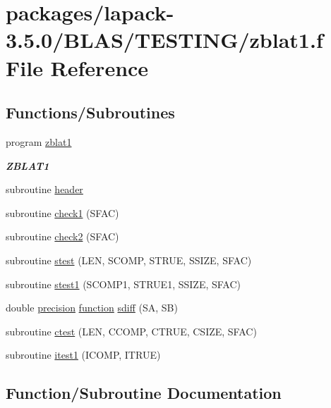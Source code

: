 \hypertarget{zblat1_8f}{}\section{packages/lapack-\/3.5.0/\+B\+L\+A\+S/\+T\+E\+S\+T\+I\+N\+G/zblat1.f File Reference}
\label{zblat1_8f}
\subsection*{Functions/\+Subroutines}
\begin{DoxyCompactItemize}
\item 
program \hyperlink{group__complex16__blas__testing_gafd27ab0ccdfd2aef875ae7f181e049b1}{zblat1}
\begin{DoxyCompactList}\small\item\em {\bfseries Z\+B\+L\+A\+T1} \end{DoxyCompactList}\item 
subroutine \hyperlink{zblat1_8f_a410931b600854e6dd3e253731606117e}{header}
\item 
subroutine \hyperlink{zblat1_8f_a87cda69493417357e26ad280bc547317}{check1} (S\+F\+A\+C)
\item 
subroutine \hyperlink{zblat1_8f_a9ff9298afee60deb7ffaea43a6d1b668}{check2} (S\+F\+A\+C)
\item 
subroutine \hyperlink{zblat1_8f_a077aa8449e1055cdecdebf7cb41738a5}{stest} (L\+E\+N, S\+C\+O\+M\+P, S\+T\+R\+U\+E, S\+S\+I\+Z\+E, S\+F\+A\+C)
\item 
subroutine \hyperlink{zblat1_8f_ab395702962b4ce31a8b18ae8c74d7f97}{stest1} (S\+C\+O\+M\+P1, S\+T\+R\+U\+E1, S\+S\+I\+Z\+E, S\+F\+A\+C)
\item 
double \hyperlink{numinquire_8h_a2c8e616467665d0b2814d4c1589ba74e}{precision} \hyperlink{afunc_8m_a7b5e596df91eadea6c537c0825e894a7}{function} \hyperlink{zblat1_8f_a094d00ddd2399699d62da4f0f6f83834}{sdiff} (S\+A, S\+B)
\item 
subroutine \hyperlink{zblat1_8f_aefe3dd8c590960cceacbe19f55ff769c}{ctest} (L\+E\+N, C\+C\+O\+M\+P, C\+T\+R\+U\+E, C\+S\+I\+Z\+E, S\+F\+A\+C)
\item 
subroutine \hyperlink{zblat1_8f_af82694537a350a6cb3615ece843dcede}{itest1} (I\+C\+O\+M\+P, I\+T\+R\+U\+E)
\end{DoxyCompactItemize}


\subsection{Function/\+Subroutine Documentation}
\hypertarget{zblat1_8f_a87cda69493417357e26ad280bc547317}{}
